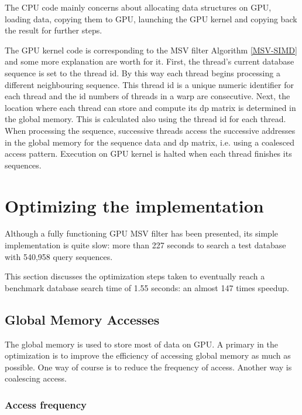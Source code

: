 The CPU code mainly concerns about allocating data structures on GPU, loading data, copying them to GPU, launching the GPU kernel and copying back the result for further steps.

The GPU kernel code is corresponding to the MSV filter Algorithm \ref{MSV-SIMD} and some more explanation are worth for it. First, the thread's current database sequence is set to the thread id. By this way each thread begins processing a different neighbouring sequence. This thread id is a unique numeric identifier for each thread and the id numbers of threads in a warp are consecutive. Next, the location where each thread can store and compute its dp matrix is determined in the global memory. This is calculated also using the thread id for each thread. When processing the sequence, successive threads access the successive addresses in the global memory for the sequence data and dp matrix, i.e. using a coalesced access pattern. Execution on GPU kernel is halted when each thread finishes its sequences.


\section{Optimizing the implementation}

Although a fully functioning GPU MSV filter has been presented, its simple implementation is quite slow: more than 227 seconds to search a test database with 540,958 query sequences.

This section discusses the optimization steps taken to eventually reach a benchmark database search time of 1.55 seconds: an almost 147 times speedup.

\subsection{Global Memory Accesses}
\label{global}

The global memory is used to store most of data on GPU. A primary in the optimization is to improve the efficiency of accessing global memory as much as possible. One way of course is to reduce the frequency of access. Another way is coalescing access.

\subsubsection*{Access frequency}

